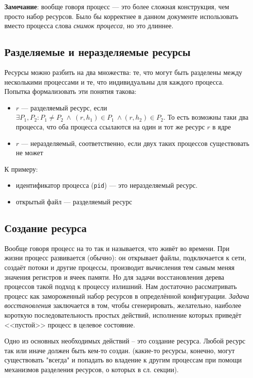 \textbf{Замечание}: вообще говоря процесс --- это более сложная конструкция, чем просто набор ресурсов. Было бы корректнее в данном документе использовать вместо процесса слова \textit{снимок процесса}, но это длиннее.

\subsection{Разделяемые и неразделяемые ресурсы}

Ресурсы можно разбить на два множества: те, что могут быть разделены между несколькими процессами и те, что индивидуальны для каждого процесса. Попытка формализовать эти понятия такова:

\begin{itemize}
	\item $r$ --- разделяемый ресурс, если $\exists P_1, P_2: P_1 \neq P_2\ \land\ (r, h_1) \in P_1\ \land (r, h_2) \in P_2$. То есть возможны таки два процесса, что оба процесса ссылаются на один и тот же ресурс $r$ в ядре
	\item $r$ --- неразделяемый, соответственно, если двух таких процессов существовать не может
\end{itemize}

К примеру: 
\begin{itemize}
	\item идентификатор процесса (\texttt{pid}) --- это неразделяемый ресурс.
	\item открытый файл --- разделяемый ресурс
\end{itemize}

\subsection{Создание ресурса}

Вообще говоря процесс на то так и называется, что живёт во времени. При жизни процесс развивается (обычно): он открывает файлы, подключается к сети, создаёт потоки и другие процессы, производит вычисления тем самым меняя значения регистров и ячеек памяти. Но для задачи восстановления дерева процессов такой подход к процессу излишний. Нам достаточно рассматривать процесс как замороженный набор ресурсов в определённой конфигурации. \emph{Задача восстановления} заключается в том, чтобы сгенерировать, желательно, наиболее короткую последовательность простых действий, исполнение которых приведёт <<пустой>> процесс в целевое состояние.

Одно из основных необходимых действий -- это создание ресурса. Любой ресурс так или иначе должен быть кем-то создан. (какие-то ресурсы, конечно, могут существовать "всегда" и попадать во владение к другим процессам при помощи механизмов разделения ресурсов, о которых в сл. секции).

